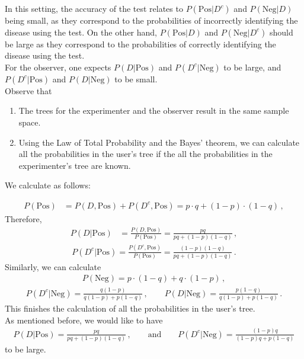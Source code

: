 \begin{ex}
In this setting, the accuracy of the test relates to $P(\text{Pos}|D^c)$ and $P(\text{Neg}|D)$ being small, as they correspond to the probabilities of incorrectly identifying the disease using the test. On the other hand, $P(\text{Pos}|D)$ and $P(\text{Neg}|D^c)$ should be large as they correspond to the probabilities of correctly identifying the disease using the test. 
\\

For the observer, one expects $P(D|\text{Pos})$ and $P(D^c| \text{Neg})$ to be large, and $P(D^c|\text{Pos})$ and $P(D|\text{Neg})$ to be small.
\\

Observe that 
\begin{enumerate}
    \item The trees for the experimenter and the observer result in the same sample space.
    \item Using the Law of Total Probability and the Bayes' theorem, we can calculate all the probabilities in the user's tree if the all the probabilities in the experimenter's tree are known. 
\end{enumerate}

We calculate as follows:

\begin{align*}
P(\text{Pos}) &= P(D, \text{Pos})+P(D^c, \text{Pos}) = p \cdot q + (1-p)\cdot (1-q)\,,
\end{align*}
Therefore, 
\begin{align*}
P(D|\text{Pos}) &= \frac{P(D, \text{Pos})}{P(\text{Pos})} = \frac{pq}{pq+(1-p)(1-q)}\,, 
\end{align*}
\begin{align*}
P(D^c| \text{Pos}) = \frac{P(D^c, \text{Pos})}{P(\text{Pos})} = \frac{(1-p)(1-q)}{pq+(1-p)(1-q)}\,.
\end{align*}
Similarly, we can calculate
\begin{align*}
P(\text{Neg}) = p\cdot(1-q) + q\cdot (1-p)\,, 
\end{align*}
\begin{align*}
P(D^c|\text{Neg}) = \frac{q(1-p)}{q(1-p)+p(1-q)}\,,\qquad
P(D|\text{Neg}) = \frac{p(1-q)}{q(1-p) +p(1-q)}\,.
\end{align*}
This finishes the calculation of all the probabilities in the user's tree. 
\\

As mentioned before, we would like to have 
\begin{align*}
P(D|\text{Pos}) = \frac{pq}{pq+(1-p)(1-q)}\,,\qquad
\text{and}\qquad P(D^c|\text{Neg}) = \frac{(1-p)q}{(1-p)q+p(1-q)}
\end{align*}
to be large.
\\


\end{ex}
